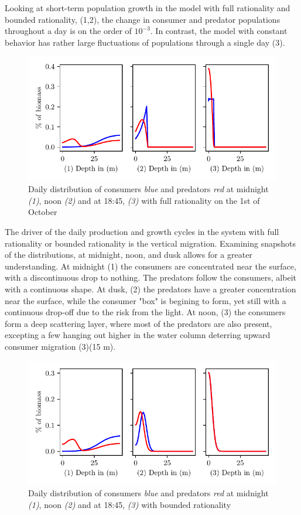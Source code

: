 Looking at short-term population growth in the model with full rationality and bounded rationality, (1,2), the change in consumer and predator populations throughout a day is on the order of $10^{-3}$. In contrast, the model with constant behavior has rather large fluctuations of populations through a single day (3).
\begin{figure}[H]
\includegraphics{plots/specific_dists_rational.pdf}
\caption{Daily distribution of consumers \emph{blue} and predators \emph{red} at midnight \emph{(1)}, noon \emph{(2)} and at 18:45, \emph{(3)} with full rationality on the 1st of October}
\label{fig:specific_dists_rational}
\end{figure}
The driver of the daily production and growth cycles in the system with full rationality or bounded rationality is the vertical migration. Examining snapshots of the distributions, at midnight, noon, and dusk allows for a greater understanding. At midnight (1) the consumers are concentrated near the surface, with a discontinuous drop to nothing. The predators follow the consumers, albeit with a continuous shape. At dusk, (2) the predators have a greater concentration near the surface, while the consumer "box" is begining to form, yet still with a continuous drop-off due to the risk from the light. At noon, (3) the consumers form a deep scattering layer, where most of the predators are also present, excepting a few hanging out higher in the water column deterring upward consumer migration (3)(15 m).
\begin{figure}[H]
\includegraphics{plots/specific_dists_semi_rational.pdf}
\caption{Daily distribution of consumers \emph{blue} and predators \emph{red} at midnight \emph{(1)}, noon \emph{(2)} and at 18:45, \emph{(3)} with bounded rationality}
\label{fig:specific_dists_semi_rational}
\end{figure}
